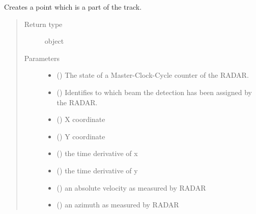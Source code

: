 \documentclass[letterpaper,10pt,english]{sphinxmanual}
\begin{document}
\begin{fulllineitems}
\label{\detokenize{datacontainers:data_containers.TrackPoint}}
Creates a point which is a part of the track.
\begin{quote}\begin{description}
\item[{Return type}] \leavevmode
object

\item[{Parameters}] \leavevmode\begin{itemize}
\item {} 
 () \textendash{} The state of a Master-Clock-Cycle counter of the RADAR.

\item {} 
 () \textendash{} Identifies to which beam the detection has been assigned by the RADAR.

\item {} 
 () \textendash{} X coordinate

\item {} 
 () \textendash{} Y coordinate

\item {} 
 () \textendash{} the time derivative of x

\item {} 
 () \textendash{} the time derivative of y

\item {} 
 () \textendash{} an absolute velocity as measured by RADAR

\item {} 
 () \textendash{} an azimuth as measured by RADAR

\end{itemize}

\end{description}\end{quote}


\end{fulllineitems}
\end{document}
